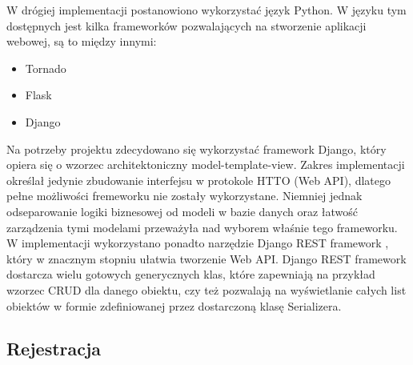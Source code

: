 \documentclass[12pt, notitlepage]{article}
\begin{document}
W drógiej implementacji postanowiono wykorzystać język Python. W języku tym dostępnych jest kilka frameworków pozwalających na stworzenie aplikacji webowej, są to między innymi:
\begin{itemize}
    \item Tornado
    \item Flask
    \item Django
\end{itemize}

Na potrzeby projektu zdecydowano się wykorzystać framework Django, który opiera się o wzorzec architektoniczny model-template-view. Zakres implementacji określał jedynie zbudowanie interfejsu w protokole HTTO (Web API), dlatego pełne możliwości fremeworku nie zostały wykorzystane. Niemniej jednak odseparowanie logiki biznesowej od modeli w bazie danych oraz łatwość zarządzenia tymi modelami przeważyła nad wyborem właśnie tego frameworku. W implementacji wykorzystano ponadto narzędzie Django REST framework \cite{django_rest_framework}, który w znacznym stopniu ułatwia tworzenie Web API. Django REST framework dostarcza wielu gotowych generycznych klas, które zapewniają na przykład wzorzec CRUD dla danego obiektu, czy też pozwalają na wyświetlanie całych list obiektów w formie zdefiniowanej przez dostarczoną klasę Serializera.

\subsection{Rejestracja} \label{sec:rejestracja}
\end{document}
